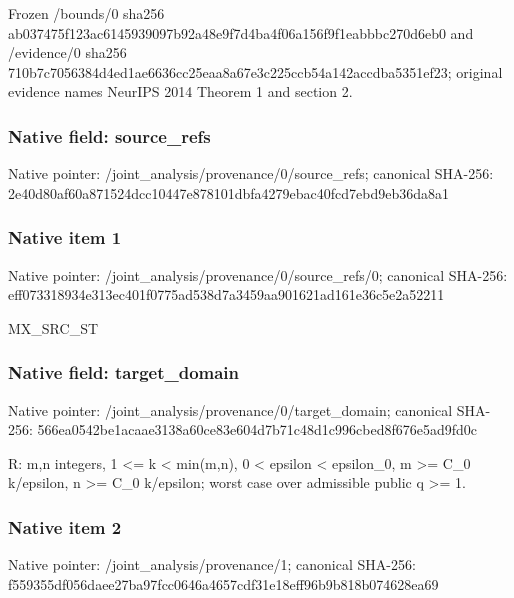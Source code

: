\documentclass[10pt,a4paper]{article}
\begin{document}
\begingroup\raggedright\sloppy Frozen /\allowbreak{}bounds/\allowbreak{}0 sha256 ab037475f123ac6145939097b92a48e9f7d4ba4f06a156f9f1eabbbc270d6eb0 and /\allowbreak{}evidence/\allowbreak{}0 sha256 710b7c7056384d4ed1ae6636cc25eaa8a67e3c225ccb54a142accdba5351ef23;\allowbreak{} original evidence names NeurIPS 2014 Theorem 1 and section 2.\par\endgroup

\subsubsection{Native field: source\_\allowbreak{}refs}
Native pointer: /joint\_\allowbreak{}analysis/provenance/0/source\_\allowbreak{}refs; canonical SHA-256: 2e40d80af60a871524dcc10447e878101dbfa4279ebac40fcd7ebd9eb36da8a1

\subsubsection{Native item 1}
Native pointer: /joint\_\allowbreak{}analysis/provenance/0/source\_\allowbreak{}refs/0; canonical SHA-256: eff073318934e313ec401f0775ad538d7a3459aa901621ad161e36c5e2a52211

\begingroup\raggedright\sloppy MX\_\allowbreak{}SRC\_\allowbreak{}ST\par\endgroup

\subsubsection{Native field: target\_\allowbreak{}domain}
Native pointer: /joint\_\allowbreak{}analysis/provenance/0/target\_\allowbreak{}domain; canonical SHA-256: 566ea0542be1acaae3138a60ce83e604d7b71c48d1c996cbed8f676e5ad9fd0c

\begingroup\raggedright\sloppy R:\allowbreak{} m,\allowbreak{}n integers,\allowbreak{} 1 <=\allowbreak{} k < min(m,\allowbreak{}n),\allowbreak{} 0 < epsilon < epsilon\_\allowbreak{}0,\allowbreak{} m >=\allowbreak{} C\_\allowbreak{}0 k/\allowbreak{}epsilon,\allowbreak{} n >=\allowbreak{} C\_\allowbreak{}0 k/\allowbreak{}epsilon;\allowbreak{} worst case over admissible public q >=\allowbreak{} 1.\par\endgroup

\subsubsection{Native item 2}
Native pointer: /joint\_\allowbreak{}analysis/provenance/1; canonical SHA-256: f559355df056daee27ba97fcc0646a4657cdf31e18eff96b9b818b074628ea69
\end{document}
